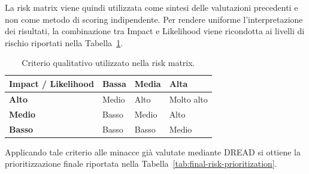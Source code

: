 La risk matrix viene quindi utilizzata come sintesi delle valutazioni precedenti e non come metodo di scoring indipendente. Per rendere uniforme l'interpretazione dei risultati, la combinazione tra Impact e Likelihood viene ricondotta ai livelli di rischio riportati nella Tabella~\ref{tab:risk-matrix}.

\begin{table}[htbp]
    \centering
    \small
    \renewcommand{\arraystretch}{1.2}

    \begin{tabular}{
        >{\centering\arraybackslash}p{2.5cm}
        >{\centering\arraybackslash}p{2.3cm}
        >{\centering\arraybackslash}p{2.3cm}
        >{\centering\arraybackslash}p{2.3cm}
    }

        \toprule

        \textbf{Impact / Likelihood} &
        \textbf{Bassa} &
        \textbf{Media} &
        \textbf{Alta} \\

        \midrule

        \textbf{Alto} &
        Medio &
        Alto &
        Molto alto \\

        \midrule

        \textbf{Medio} &
        Basso &
        Medio &
        Alto \\

        \midrule

        \textbf{Basso} &
        Basso &
        Basso &
        Medio \\

        \bottomrule

    \end{tabular}

    \caption{Criterio qualitativo utilizzato nella risk matrix.}
    \label{tab:risk-matrix}
\end{table}

Applicando tale criterio alle minacce già valutate mediante DREAD si ottiene la prioritizzazione finale riportata nella Tabella~\ref{tab:final-risk-prioritization}.

